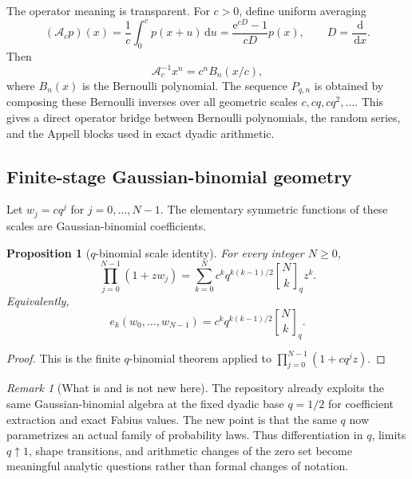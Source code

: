 \documentclass[11pt,oneside]{article}
\newtheorem{proposition}[theorem]{Proposition}
\theoremstyle{definition}
\theoremstyle{remark}
\newtheorem{remark}[theorem]{Remark}
\newcommand{\e}{\mathrm e}
\newcommand{\dd}{\,\mathrm d}
\newcommand{\qbinom}[3]{\genfrac{[}{]}{0pt}{}{#1}{#2}_{#3}}
\begin{document}
The operator meaning is transparent.  For $c>0$, define uniform averaging
\[
 (\mathcal A_cp)(x)=\frac1c\int_0^c p(x+u)\dd u
 =\frac{\e^{cD}-1}{cD}p(x),
 \qquad D=\frac{\dd}{\dd x}.
\]
Then
\begin{equation}
 \mathcal A_c^{-1}x^n=c^nB_n(x/c),                           \label{eq:bernoulli-inverse}
\end{equation}
where $B_n(x)$ is the Bernoulli polynomial.  The sequence $P_{q,n}$ is obtained by composing
these Bernoulli inverses over all geometric scales $c,cq,cq^2,\ldots$.  This gives a direct
operator bridge between Bernoulli polynomials, the random series, and the Appell blocks used
in exact dyadic arithmetic.

\subsection{Finite-stage Gaussian-binomial geometry}

Let $w_j=cq^j$ for $j=0,\ldots,N-1$.  The elementary symmetric functions of these scales are
Gaussian-binomial coefficients.

\begin{proposition}[$q$-binomial scale identity]
\label{prop:qbinomial}
For every integer $N\ge0$,
\begin{equation}
 \prod_{j=0}^{N-1}(1+zw_j)
 =\sum_{k=0}^{N}c^kq^{k(k-1)/2}\qbinom{N}{k}{q}z^k.          \label{eq:q-binomial-scales}
\end{equation}
Equivalently,
\begin{equation}
 e_k(w_0,\ldots,w_{N-1})
 =c^kq^{k(k-1)/2}\qbinom{N}{k}{q}.                           \label{eq:elementary-scales}
\end{equation}
\end{proposition}

\begin{proof}
This is the finite $q$-binomial theorem applied to
$\prod_{j=0}^{N-1}(1+cq^jz)$.
\end{proof}

\begin{remark}[What is and is not new here]
The repository already exploits the same Gaussian-binomial algebra at the fixed dyadic base
$q=1/2$ for coefficient extraction and exact Fabius values.  The new point is that the same
$q$ now parametrizes an actual family of probability laws.  Thus differentiation in $q$,
limits $q\uparrow1$, shape transitions, and arithmetic changes of the zero set become
meaningful analytic questions rather than formal changes of notation.
\end{remark}
\end{document}
